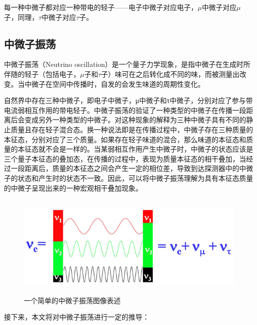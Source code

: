 \documentclass[10pt,a4paper]{article}
\begin{document}
每一种中微子都对应一种带电的轻子——电子中微子对应电子，$\mu$中微子对应$\mu$子，同理，$\tau$中微子对应$\tau$子。

\newpage

\subsection{中微子振荡}\label{sub:sysover}


中微子振荡（Neutrino oscillation）是一个量子力学现象，是指中微子在生成时所伴随的轻子（包括电子，$\mu$子和$\tau$子）味可在之后转化成不同的味，而被测量出改变。当中微子在空间中传播时，自发的会发生味道的周期性变化。

自然界中存在三种中微子，即电子中微子，μ中微子和τ中微子，分别对应了参与带电流弱相互作用的带电轻子。中微子振荡的验证了一种类型的中微子在传播一段距离后会变成另外一种类型的中微子。对这种现象的解释为三种中微子具有不同的静止质量且存在轻子混合态。换一种说法即是在传播过程中，中微子存在三种质量的本征态，分别对应了三个质量。如果存在轻子味道的混合，那么味道的本征态和质量的本征态就不会是一样的。当某弱相互作用产生中微子时，中微子的状态应该是三个量子本征态的叠加态，在传播的过程中，表现为质量本征态的相干叠加，当经过一段距离后，质量的本征态之间会产生一定的相位差，导致到达探测器中的中微子的状态和产生时的状态不一致。因此，可以将中微子振荡理解为具有本征态质量的中微子呈现出来的一种宏观相干叠加现象。


\begin{figure}[ht]
 \centering
 \includegraphics[height=5cm]{images/中微子振荡示意图.jpg}
 \caption{一个简单的中微子振荡图像表述}
 \label{fig:singleblock}
\end{figure}

接下来，本文将对中微子振荡进行一定的推导\cite{An:2015jdp}：
\end{document}
